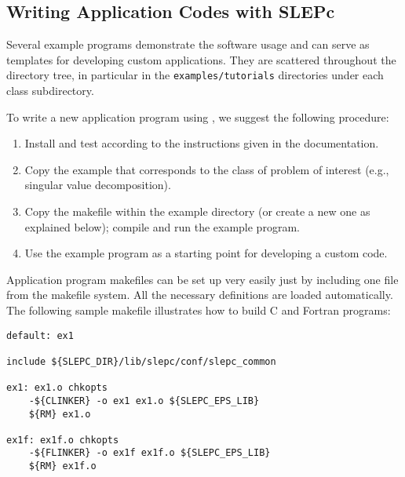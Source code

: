 \subsection{Writing Application Codes with SLEPc}

Several example programs demonstrate the software usage and can serve as templates for developing custom applications. They are scattered throughout the \slepc directory tree, in particular in the \Verb!examples/tutorials! directories under each class subdirectory.

To write a new application program using \slepc, we suggest the following procedure:
\begin{enumerate}
\item Install and test \slepc according to the instructions given in the documentation.
\item Copy the \slepc example that corresponds to the class of problem of interest (e.g., singular value decomposition).
\item Copy the makefile within the example directory (or create a new one as explained below); compile and run the example program.
\item Use the example program as a starting point for developing a custom code.
\end{enumerate}

	Application program makefiles can be set up very easily just by including one file from the \slepc makefile system. All the necessary \petsc{} definitions are loaded automatically. The following sample makefile illustrates how to build C and Fortran programs:

	\begin{Verbatim}[fontsize=\small]
default: ex1

include ${SLEPC_DIR}/lib/slepc/conf/slepc_common

ex1: ex1.o chkopts
	-${CLINKER} -o ex1 ex1.o ${SLEPC_EPS_LIB}
	${RM} ex1.o

ex1f: ex1f.o chkopts
	-${FLINKER} -o ex1f ex1f.o ${SLEPC_EPS_LIB}
	${RM} ex1f.o
	\end{Verbatim}


